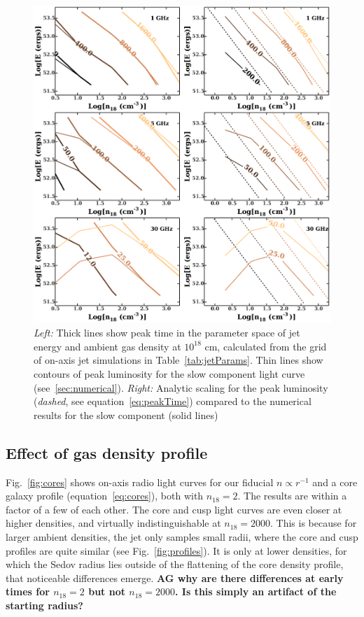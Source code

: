 \documentclass[usenatbib,fleqn]{mnras}
\begin{document}
\begin{figure}
  \includegraphics[width=16cm]{tp_contours_new.pdf}
  \caption{\label{fig:ContoursTp} {\it {Left:}} Thick lines show peak
    time in the parameter space of jet energy and ambient gas density
    at $10^{18}$ cm, calculated from the grid of on-axis jet
    simulations in Table~\ref{tab:jetParams}. Thin lines show contours
    of peak luminosity for the slow component light curve
    (see~\ref{sec:numerical}). {\it Right:} Analytic scaling for the
    peak luminosity ({\it dashed}, see equation~\ref{eq:peakTime})
    compared to the numerical results for the slow component (solid
    lines)}
\end{figure}

\subsection{Effect of gas density profile}
\label{sec:profileComp}
Fig.~\ref{fig:cores} shows on-axis radio light curves for our fiducial
$n\propto r^{-1}$ and a core galaxy profile (equation~\ref{eq:cores}),
both with $n_{18}=2$.  The results are within a factor of a few of
each other. The core and cusp light curves are even closer at higher
densities, and virtually indistinguishable at $n_{18}=2000$. This is
because for larger ambient densities, the jet only samples small radii, where
the core and cusp profiles are quite similar (see
Fig.~\ref{fig:profiles}). It is only at lower densities, for which the
Sedov radius lies outside of the flattening of the core density
profile, that noticeable differences emerge. {\bf AG why are there
  differences at early times for $n_{18}=2$ but not $n_{18}=2000$. Is
  this simply an artifact of the starting radius?}
\end{document}
